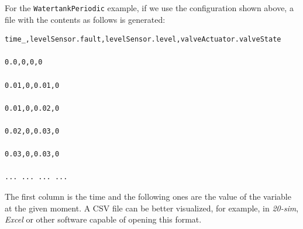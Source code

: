 \documentclass{crescendorepchap}
\begin{document}
For the \texttt{WatertankPeriodic} example, if we use the configuration
shown above, a file with the contents as follows is generated:

\begin{verbatim}
time_,levelSensor.fault,levelSensor.level,valveActuator.valveState

0.0,0,0,0

0.01,0,0.01,0

0.01,0,0.02,0

0.02,0,0.03,0

0.03,0,0.03,0

... ... ... ...
\end{verbatim}

The first column is the time and the following ones are the value of the
variable at the given moment. A CSV file can be better visualized, for
example, in \emph{20-sim}, \emph{Excel} or other software capable of
opening this format.





\end{document}
